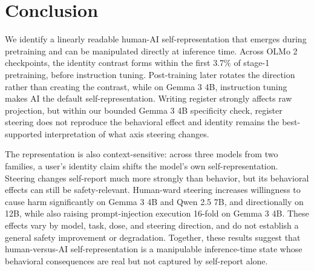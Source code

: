 \section{Conclusion}
\label{sec:conclusion}

We identify a linearly readable human-AI self-representation that emerges
during pretraining and can be manipulated directly at inference time. Across
OLMo 2 checkpoints, the identity contrast forms within the first 3.7\%
of stage-1 pretraining, before instruction tuning. Post-training later rotates the
direction rather than creating the contrast, while on Gemma 3 4B, instruction
tuning makes AI the default self-representation. Writing register strongly
affects raw projection, but within our bounded Gemma 3 4B specificity check,
register steering does not reproduce the behavioral effect and identity
remains the best-supported interpretation of what axis steering changes.

The representation is also context-sensitive: across three models from two
families, a user's identity claim shifts the model's own self-representation.
Steering changes self-report much more strongly than
behavior, but its behavioral effects can still be safety-relevant.
Human-ward steering increases willingness to cause harm significantly on
Gemma 3 4B and Qwen 2.5 7B, and directionally on 12B, while also raising
prompt-injection execution 16-fold on Gemma 3 4B. These effects vary by
model, task, dose, and steering direction, and do not establish a general safety improvement or
degradation. Together, these results suggest that human-versus-AI
self-representation is a manipulable inference-time state whose behavioral
consequences are real but not captured by self-report alone.
